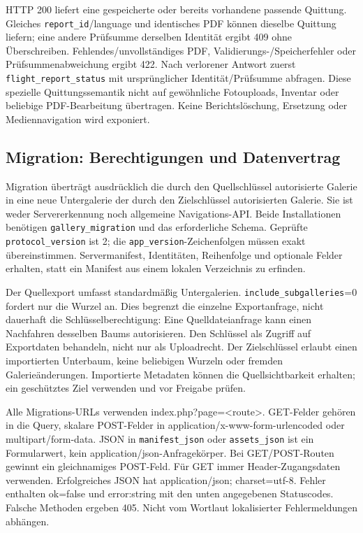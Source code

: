 \documentclass[11pt,a4paper]{article}
\newcommand{\codeword}[1]{\nolinkurl{#1}}
\begin{document}
HTTP 200 liefert eine gespeicherte oder bereits vorhandene passende Quittung. Gleiches
\codeword{report_id}/language und identisches PDF können dieselbe Quittung liefern; eine
andere Prüfsumme derselben Identität ergibt 409 ohne Überschreiben.
Fehlendes/unvollständiges PDF, Validierungs-/Speicherfehler oder Prüfsummenabweichung ergibt
422. Nach verlorener Antwort zuerst \codeword{flight_report_status} mit ursprünglicher
Identität/Prüfsumme abfragen. Diese spezielle Quittungssemantik nicht auf gewöhnliche
Fotouploads, Inventar oder beliebige PDF-Bearbeitung übertragen. Keine Berichtslöschung,
Ersetzung oder Mediennavigation wird exponiert.

\subsection{\texorpdfstring{Migration: Berechtigungen und Datenvertrag}{Migration: Berechtigungen und Datenvertrag}}

\label{api352:migration-contract}

Migration überträgt ausdrücklich die durch den Quellschlüssel autorisierte Galerie in eine
neue Untergalerie der durch den Zielschlüssel autorisierten Galerie. Sie ist weder
Servererkennung noch allgemeine Navigations-API. Beide Installationen benötigen
\codeword{gallery_migration} und das erforderliche Schema. Geprüfte
\codeword{protocol_version} ist 2; die \codeword{app_version}-Zeichenfolgen müssen exakt
übereinstimmen. Servermanifest, Identitäten, Reihenfolge und optionale Felder erhalten,
statt ein Manifest aus einem lokalen Verzeichnis zu erfinden.

Der Quellexport umfasst standardmäßig Untergalerien. \codeword{include_subgalleries}=0
fordert nur die Wurzel an. Dies begrenzt die einzelne Exportanfrage, nicht dauerhaft die
Schlüsselberechtigung: Eine Quelldateianfrage kann einen Nachfahren desselben Baums
autorisieren. Den Schlüssel als Zugriff auf Exportdaten behandeln, nicht nur als
Uploadrecht. Der Zielschlüssel erlaubt einen importierten Unterbaum, keine beliebigen
Wurzeln oder fremden Galerieänderungen. Importierte Metadaten können die Quellsichtbarkeit
erhalten; ein geschütztes Ziel verwenden und vor Freigabe prüfen.

Alle Migrations-URLs verwenden index.php?page=<route>. GET-Felder gehören in die Query,
skalare POST-Felder in application/x-www-form-urlencoded oder multipart/form-data. JSON in
\codeword{manifest_json} oder \codeword{assets_json} ist ein Formularwert, kein
application/json-Anfragekörper. Bei GET/POST-Routen gewinnt ein gleichnamiges POST-Feld. Für
GET immer Header-Zugangsdaten verwenden. Erfolgreiches JSON hat application/json;
charset=utf-8. Fehler enthalten ok=false und error:string mit den unten angegebenen
Statuscodes. Falsche Methoden ergeben 405. Nicht vom Wortlaut lokalisierter Fehlermeldungen
abhängen.
\end{document}
